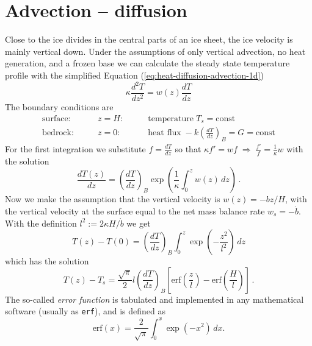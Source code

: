 \documentclass[11pt,a4paper,halfparskip]{scrartcl}
\begin{document}
\section{Advection -- diffusion}
\label{sec:advection-diffusion}

Close to the ice divides in the central parts of an ice sheet, the ice
velocity is mainly vertical down.  Under the assumptions of only vertical
advection, no heat generation, and a frozen base we can calculate the steady
state temperature profile with the simplified Equation
(\ref{eq:heat-diffusion-advection-1d})
%
\begin{equation}
 \label{eq:heat-diffusion-advection-1d-steady}
 \kappa \frac{d^2T}{d z^2} =  w(z) \frac{d T}{d z}
\end{equation}
%
The boundary conditions are
\begin{align*}
 \text{surface:} \qquad & z=H: &\qquad \text{temperature}\;T_s = \text{const}\\
 \text{bedrock:} \qquad & z=0: &\qquad \text{heat flux}\;-k \left(\frac{dT}{dz}\right)_{B} = G
 = \text{const}
\end{align*}
%
For the first integration we substitute $f = \frac{dT}{dz}$ so that $\kappa f'
= wf \; \Longrightarrow \; \frac{f' }{f} = \frac{1}{\kappa} w$ with the
solution
%
\begin{equation}
 \label{eq:8}
 \frac{dT(z)}{dz} = \left(\frac{dT}{dz}\right)_{B}  \exp \left( \frac{1}{\kappa} \int_0^z w(z)\, dz \right)\,.
\end{equation}
%
Now we make the assumption that the vertical velocity is $w(z) = -b z/H$, with
the vertical velocity at the surface equal to the net mass balance rate $w_{s}
= -\dot{b}$.  With the definition $l^2 := 2\kappa H /\dot{b}$ we get
%
\begin{equation}
 \label{eq:10}
 T(z) - T(0) = \left(\frac{dT}{dz}\right)_{B}  \int_0^z \exp \left(-\frac{z^2}{l^2}   \right) \,dz
\end{equation}
%
which has the solution
%
\begin{equation}
 \label{eq:11}
 T(z) - T_s = \frac{\sqrt\pi}{2} l \left(\frac{dT}{dz}\right)_{B} 
 \left[ {\textrm{erf}} \left( \frac{z}{l} \right) - {\textrm{erf}} \left( \frac{H}{l} \right) \right]\,.
\end{equation}
%
The so-called \emph{error function} is tabulated and implemented in any
mathematical software (usually as \texttt{erf}), and is defined as
%
\begin{equation*}
 \label{eq:12}
 {\textrm{erf}}(x) = \frac{2}{\sqrt{\pi}} \int_0^x \exp(-x^2) \, dx.
\end{equation*}
\end{document}
